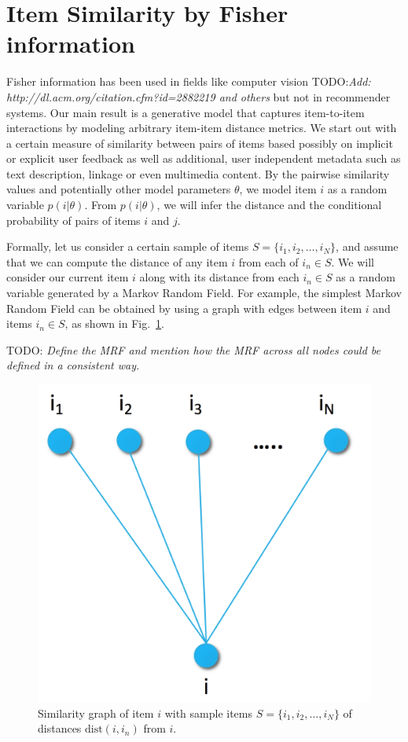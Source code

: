 \section{Item Similarity by Fisher information}

Fisher information has been used in fields like computer vision TODO:\textit{Add: http://dl.acm.org/citation.cfm?id=2882219 and others} but not in recommender systems. Our main result is a generative model that captures item-to-item interactions by modeling arbitrary item-item distance metrics.
We start out with a certain measure of similarity between pairs of items based possibly on implicit or explicit user feedback as well as additional, user independent metadata such as text description, linkage or even multimedia content. 
By the pairwise similarity values and potentially other model parameters $\theta$, we model item $i$ as a random variable $p (i|\theta)$. 
From $p (i|\theta)$, we will infer the distance and the conditional probability of pairs of items $i$ and $j$.

Formally, let us consider a certain sample of items $S=\{i_1,i_2,\ldots,i_N\}$, and assume that we can compute the distance of any item $i$ from each of $i_n \in S$.
We will consider our current item $i$ along with its distance from each $i_n\in S$ as a random variable generated by a Markov Random Field.
For example, the simplest Markov Random Field can be obtained by using a graph with edges between item $i$ and items $i_n\in S$, as shown in  Fig.~\ref{fig:pairwise}. 

TODO: \textit{Define the MRF and mention how the MRF across all nodes could be defined in a consistent way.}

\begin{figure}
\centerline{
  \includegraphics[scale=.2]{i2i_pair.png}}

\caption[]{Similarity graph of item $i$ with sample items $S=\{i_1,i_2,...,i_{N}\}$ of distances $\mbox{dist}(i,i_n)$ from $i$.}
\label{fig:pairwise}
\end{figure}

